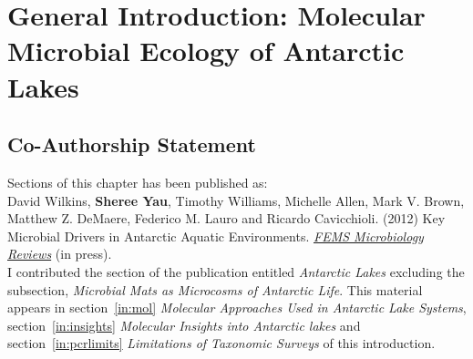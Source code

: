 \chapter[General Introduction]{General Introduction: Molecular Microbial Ecology of Antarctic Lakes}
\label{ch:intro}


\section*{Co-Authorship Statement}

Sections of this chapter has been published as:\\

David Wilkins, \textbf{Sheree Yau}, Timothy Williams, Michelle Allen, Mark V. Brown, Matthew Z. DeMaere,
Federico M. Lauro and Ricardo Cavicchioli. (2012)
Key Microbial Drivers in Antarctic Aquatic Environments.
\textit{\underline{FEMS Microbiology Reviews}} 
(in press).\\

I contributed the section of the publication entitled \emph{Antarctic Lakes} excluding the subsection, \emph{Microbial Mats as Microcosms of Antarctic Life}.
This material appears in section~\ref{in:mol} \emph{Molecular Approaches Used in Antarctic Lake Systems}, section~\ref{in:insights} \emph{Molecular Insights into Antarctic lakes} and section~\ref{in:pcrlimits} \emph{Limitations of Taxonomic Surveys} of this introduction.
\newpage


